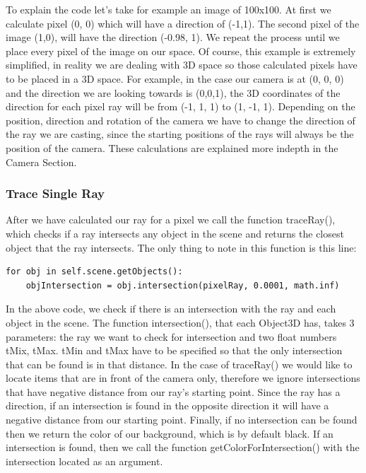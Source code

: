 \documentclass[10pt]{scrartcl}
\begin{document}
To explain the code let's take for example an image of 100x100. At first we calculate pixel (0, 0) which will have a direction of (-1,1). The second pixel of the image (1,0), will have the direction (-0.98, 1). We repeat the process until we place every pixel of the image on our space. Of course, this example is extremely simplified, in reality we are dealing with 3D space so those calculated pixels have to be placed in a 3D space. For example, in the case our camera is at (0, 0, 0) and the direction we are looking towards is (0,0,1), the 3D coordinates of the direction for each pixel ray will be from (-1, 1, 1) to (1, -1, 1). Depending on the position, direction and rotation of the camera we have to change the direction of the ray we are casting, since the starting positions of the rays will always be the position of the camera. These calculations are explained more indepth in the Camera Section.
\par

\subsubsection{Trace Single Ray}
After we have calculated our ray for a pixel we call the function traceRay(), which checks if a ray intersects any object in the scene and returns the closest object that the ray intersects. The only thing to note in this function is this line:

\begin{lstlisting}
for obj in self.scene.getObjects():
    objIntersection = obj.intersection(pixelRay, 0.0001, math.inf)       
\end{lstlisting}

In the above code, we check if there is an intersection with the ray and each object in the scene. The function intersection(), that each Object3D has, takes 3 parameters: the ray we want to check for intersection and two float numbers tMix, tMax. tMin and tMax have to be specified so that the only intersection that can be found is in that distance. In the case of traceRay() we would like to locate items that are in front of the camera only, therefore we ignore intersections that have negative distance from our ray's starting point. Since the ray has a direction, if an intersection is found in the opposite direction it will have a negative distance from our starting point. Finally, if no intersection can be found then we return the color of our background, which is by default black. If an intersection is found, then we call the function getColorForIntersection() with the intersection located as an argument.
\par
\end{document}
